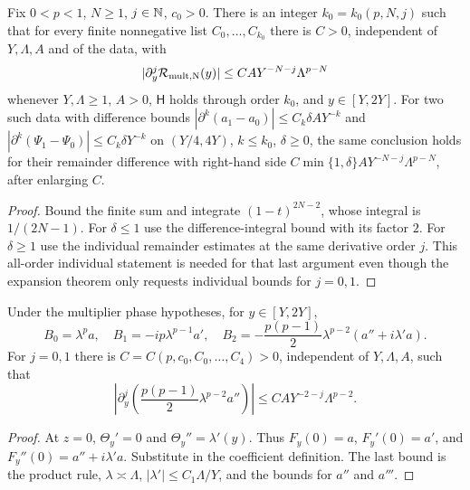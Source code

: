 \begin{lemma}
  \label{lem:c03_mult_remainder_all_orders}
  Fix $0<p<1$, $N\ge1$, $j\in\mathbb{N}$, $c_0>0$.
  There is an integer $k_0=k_0(p,N,j)$ such that for every finite nonnegative list
  $C_0,\ldots,C_{k_0}$ there is $C>0$, independent of $Y,\Lambda,A$ and of the data, with
  \[
    |\partial_y^j\mathcal{R}_{\rm mult,N}(y)|\le CAY^{-N-j}\Lambda^{p-N}
  \]
  whenever $Y,\Lambda\ge1$, $A>0$, $\mathsf H$ holds through order $k_0$, and $y\in[Y,2Y]$.
  For two such data with difference bounds
  $|\partial^k(a_1-a_0)|\le C_k\delta AY^{-k}$ and
  $|\partial^k(\Psi_1-\Psi_0)|\le C_k\delta Y^{-k}$ on $(Y/4,4Y)$, $k\le k_0$, $\delta\ge0$,
  the same conclusion holds for their remainder difference with right-hand side
  $C\min\{1,\delta\}AY^{-N-j}\Lambda^{p-N}$, after enlarging $C$.
\end{lemma}
\begin{proof}
  Bound the finite sum and integrate $(1-t)^{2N-2}$, whose integral is $1/(2N-1)$.
  For $\delta\le1$ use the difference-integral bound with its factor $2$.
  For $\delta\ge1$ use the individual remainder estimates at the same derivative order $j$.
  This all-order individual statement is needed for that last argument even though the
  expansion theorem only requests individual bounds for $j=0,1$.
\end{proof}

\begin{lemma}
  \label{lem:c03_mult_two_term_coefficients}
  Under the multiplier phase hypotheses, for $y\in[Y,2Y]$,
  \[
    B_0=\lambda^pa,\quad B_1=-ip\lambda^{p-1}a',\quad
    B_2=-\frac{p(p-1)}2\lambda^{p-2}(a''+i\lambda'a).
  \]
  For $j=0,1$ there is $C=C(p,c_0,C_0,\ldots,C_4)>0$, independent of $Y,\Lambda,A$,
  such that
  \[
    \left|\partial_y^j\left(\frac{p(p-1)}2\lambda^{p-2}a''\right)\right|
       \le CAY^{-2-j}\Lambda^{p-2}.
  \]
\end{lemma}
\begin{proof}
  At $z=0$, $\Theta_y'=0$ and $\Theta_y''=\lambda'(y)$.
  Thus $F_y(0)=a$, $F_y'(0)=a'$, and $F_y''(0)=a''+i\lambda'a$.
  Substitute in the coefficient definition. The last bound is the product rule,
  $\lambda\asymp\Lambda$, $|\lambda'|\le C_1\Lambda/Y$, and the bounds for $a''$ and $a'''$.
\end{proof}

